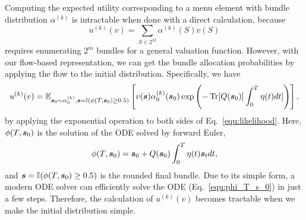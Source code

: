 Computing the expected 
utility corresponding to a menu element with bundle distribution $\alpha^{(k)}$ 
is intractable when done with a direct calculation,
because
%
\begin{equation}
    u^{(k)}(v) = \sum_{S\in 2^M} \alpha^{(k)}(S)v(S)
\end{equation}
%
requires enumerating $2^m$ bundles for a general valuation function.
However, with our flow-based representation, we can get the bundle allocation probabilities by applying the flow to the initial distribution. Specifically, we have
\begin{align}
    u^{(k)}(v) = \mathbb{E}_{{\bm{s}}_0\sim \alpha^{(k)}_0, {\bm{s}}=\mathbb{I}(\phi(T,{\bm{s}}_0)\ge 0.5)} \left[v({\bm{s}}) \alpha^{(k)}_0({\bm{s}}_0)\exp\left(-\operatorname{Tr}[Q({\bm{s}}_0)]\int_0^T \eta(t) dt]\right)\right],\label{equ:u}
\end{align}
by applying the exponential operation to both sides of Eq.~\ref{equ:likelihood}. Here, $\phi(T,{\bm{s}}_0)$ is the solution of the ODE solved by forward Euler,
%
\begin{align}
    \phi(T,{\bm{s}}_0) = {\bm{s}}_0 + Q({\bm{s}}_0)\int_0^T \eta(t){\bm{s}}_t dt,\label{equ:phi_T_s_0}
\end{align}
%
and ${\bm{s}}=\mathbb{I}(\phi(T,{\bm{s}}_0)\ge 0.5)$ is the rounded final bundle. Due to its simple form, a modern ODE solver can efficiently solve the ODE (Eq.~\ref{equ:phi_T_s_0}) in just a few steps. Therefore, the calculation of $u^{(k)}(v)$ becomes tractable when we make the initial distribution simple.

%

